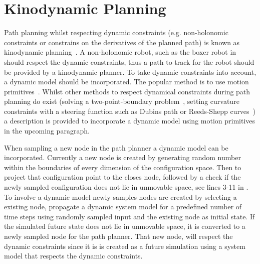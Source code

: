 \section{Kinodynamic Planning}\label{sec:kinodynamic_planning}
Path planning whilst respecting dynamic constraints (e.g. non-holonomic constraints or constrains on the derivatives of the planned path) is known as kinodynamic planning~\cite{donald_kinodynamic_1993}. A non-holonomic robot, such as the boxer robot in  should respect the dynamic constraints, thus a path to track for the robot should be provided by a kinodynamic planner. To take dynamic constraints into account, a dynamic model should be incorporated. The popular method is to use motion primitives~\cite{sakcak_samplingbased_2019,karaman_samplingbased_2011}. Whilst other methods to respect dynamical constraints during path planning do exist (solving a two-point-boundary problem~\cite{li_asymptotically_2016}, setting curvature constraints with a steering function such as Dubins path or Reeds-Shepp curves~\cite{lavalle_planning_2006}) a description is provided to incorporate a dynamic model using motion primitives in the upcoming paragraph.\bs

When sampling a new node in the path planner a dynamic model can be incorporated. Currently a new node is created by generating random number within the boundaries of every dimension of the configuration space. Then to project that configuration point to the closes node, followed by a check if the newly sampled configuration does not lie in unmovable space, see lines 3-11 in . To involve a dynamic model newly samples nodes are created by selecting a existing node, propagate a dynamic system model for a predefined number of time steps using randomly sampled input and the existing node as initial state. If the simulated future state does not lie in unmovable space, it is converted to a newly sampled node for the path planner. That new node, will respect the dynamic constraints since it is is created as a future simulation using a system model that respects the dynamic constraints.\bs

